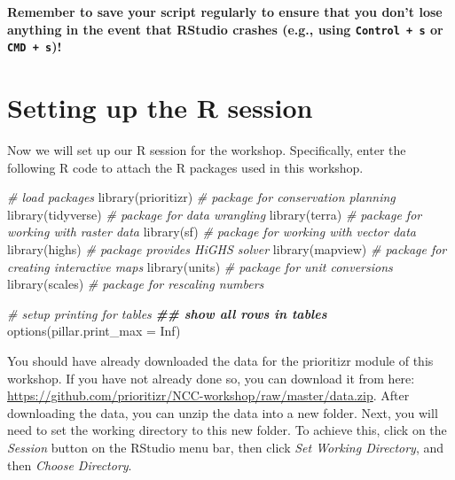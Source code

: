 \documentclass[
  12pt,
]{book}
\newenvironment{Shaded}{\begin{snugshade}}{\end{snugshade}}
\newcommand{\AttributeTok}[1]{\textcolor[rgb]{0.77,0.63,0.00}{#1}}
\newcommand{\CommentTok}[1]{\textcolor[rgb]{0.56,0.35,0.01}{\textit{#1}}}
\newcommand{\ConstantTok}[1]{\textcolor[rgb]{0.00,0.00,0.00}{#1}}
\newcommand{\DocumentationTok}[1]{\textcolor[rgb]{0.56,0.35,0.01}{\textbf{\textit{#1}}}}
\newcommand{\FunctionTok}[1]{\textcolor[rgb]{0.00,0.00,0.00}{#1}}
\newcommand{\NormalTok}[1]{#1}
\begin{document}
\textbf{Remember to save your script regularly to ensure that you don't lose anything in the event that RStudio crashes (e.g., using \texttt{Control\ +\ s} or \texttt{CMD\ +\ s})!}

\hypertarget{setting-up-the-r-session}{%
\section{Setting up the R session}\label{setting-up-the-r-session}}

Now we will set up our R session for the workshop. Specifically, enter the following R code to attach the R packages used in this workshop.

\begin{Shaded}
\begin{Highlighting}[]
\CommentTok{\# load packages}
\FunctionTok{library}\NormalTok{(prioritizr) }\CommentTok{\# package for conservation planning}
\FunctionTok{library}\NormalTok{(tidyverse)  }\CommentTok{\# package for data wrangling}
\FunctionTok{library}\NormalTok{(terra)      }\CommentTok{\# package for working with raster data}
\FunctionTok{library}\NormalTok{(sf)         }\CommentTok{\# package for working with vector data}
\FunctionTok{library}\NormalTok{(highs)      }\CommentTok{\# package provides HiGHS solver}
\FunctionTok{library}\NormalTok{(mapview)    }\CommentTok{\# package for creating interactive maps}
\FunctionTok{library}\NormalTok{(units)      }\CommentTok{\# package for unit conversions}
\FunctionTok{library}\NormalTok{(scales)     }\CommentTok{\# package for rescaling numbers}

\CommentTok{\# setup printing for tables}
\DocumentationTok{\#\# show all rows in tables}
\FunctionTok{options}\NormalTok{(}\AttributeTok{pillar.print\_max =} \ConstantTok{Inf}\NormalTok{)}
\end{Highlighting}
\end{Shaded}

You should have already downloaded the data for the prioritizr module of this workshop. If you have not already done so, you can download it from here: \url{https://github.com/prioritizr/NCC-workshop/raw/master/data.zip}. After downloading the data, you can unzip the data into a new folder. Next, you will need to set the working directory to this new folder. To achieve this, click on the \emph{Session} button on the RStudio menu bar, then click \emph{Set Working Directory}, and then \emph{Choose Directory}.
\end{document}

